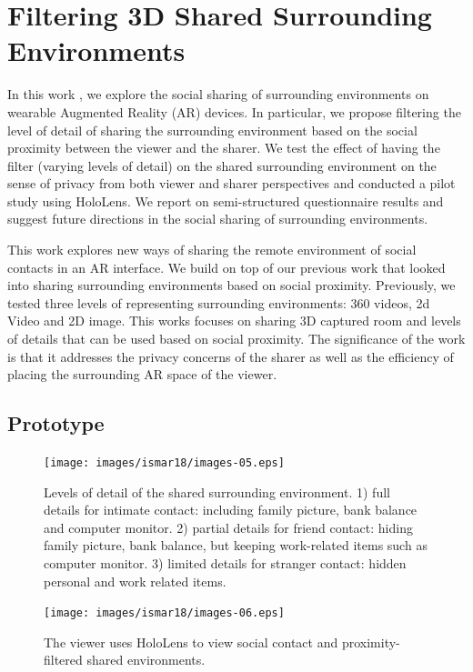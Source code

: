 \section{Filtering 3D Shared Surrounding Environments}
\label{sec:surrounding:environment}

In this work \cite{Nassani2018b}, we explore the social sharing of surrounding environments on wearable Augmented Reality (AR) devices. In particular, we propose filtering the level of detail of sharing the surrounding environment based on the social proximity between the viewer and the sharer. We test the effect of having the filter (varying levels of detail) on the shared surrounding environment on the sense of privacy from both viewer and sharer perspectives and conducted a pilot study using HoloLens. We report on semi-structured questionnaire results and suggest future directions in the social sharing of surrounding environments.

This work explores new ways of sharing the remote environment of social contacts in an AR interface. We build on top of our previous work \cite{Nassani2018a} that looked into sharing surrounding environments based on social proximity. Previously, we tested three levels of representing surrounding environments: 360 videos, 2d Video and 2D image. This works focuses on sharing 3D captured room and levels of details that can be used based on social proximity. The significance of the work is that it addresses the privacy concerns of the sharer as well as the efficiency of placing the surrounding AR space of the viewer.

\subsection{Prototype}

\begin{figure}[ht]
  \centering
  \texttt{[image: images/ismar18/images-05.eps]}
  \caption{Levels of detail of the shared surrounding environment. 1) full details for intimate contact: including family picture, bank balance and computer monitor. 2) partial details for friend contact: hiding family picture, bank balance, but keeping work-related items such as computer monitor. 3) limited details for stranger contact: hidden personal and work related items.}
  \label{fig:environment:environment-levels}
\end{figure}

\begin{figure}
    \centering
    \texttt{[image: images/ismar18/images-06.eps]}
    \caption{The viewer uses HoloLens to view social contact and proximity-filtered shared environments.}
    \label{fig:environment:setup}
\end{figure}

